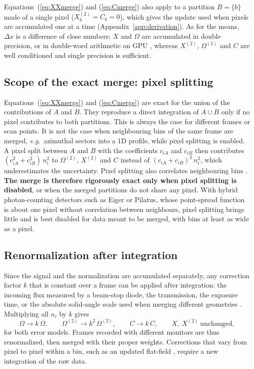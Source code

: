 \documentclass{iucrjournals}
\newcommand{\Om}{\Omega}
\newcommand{\OmS}{\Omega^{(2)}}
\newcommand{\XX}{X^{(2)}}
\begin{document}
Equations~(\ref{eq:XXmerge}) and (\ref{eq:Cmerge}) also apply to a partition $B=\{b\}$ made of a single pixel ($\XX_b=C_b=0$), which gives the update used when pixels are accumulated one at a time (Appendix~\ref{app:derivation}).
As for the means, $\Delta x$ is a difference of close numbers: $X$ and $\Om$ are accumulated in double precision, or in double-word arithmetic on GPU \cite{Joldes2017}, whereas $\XX$, $\OmS$ and $C$ are well conditioned and single precision is sufficient.

\subsection{Scope of the exact merge: pixel splitting}
\label{sec:splitting}

Equations~(\ref{eq:XXmerge}) and (\ref{eq:Cmerge}) are exact for the union of the contributions of $A$ and $B$.
They reproduce a direct integration of $A\cup B$ only if no pixel contributes to both partitions.
This is always the case for different frames or scan points.
It is not the case when neighbouring bins of the same frame are merged, \emph{e.g.}\ azimuthal sectors into a 1D profile, while pixel splitting is enabled.
A pixel split between $A$ and $B$ with the coefficients $c_{iA}$ and $c_{iB}$ then contributes $(c_{iA}^2+c_{iB}^2)\,n_i^2$ to $\OmS$, $\XX$ and $C$ instead of $(c_{iA}+c_{iB})^2\,n_i^2$, which underestimates the uncertainty.
Pixel splitting also correlates neighbouring bins \cite{Yang2014}.
\textbf{The merge is therefore rigorously exact only when pixel splitting is disabled}, or when the merged partitions do not share any pixel.
With hybrid photon-counting detectors such as Eiger or Pilatus, whose point-spread function is about one pixel without correlation between neighbours, pixel splitting brings little and is best disabled for data meant to be merged, with bins at least as wide as a pixel.

\subsection{Renormalization after integration}
\label{sec:renorm}

Since the signal and the normalization are accumulated separately, any correction factor $k$ that is constant over a frame can be applied after integration: the incoming flux measured by a beam-stop diode, the transmission, the exposure time, or the absolute solid-angle scale used when merging different geometries \cite{Kieffer2020}.
Multiplying all $n_i$ by $k$ gives
\begin{equation}
  \Om\to k\,\Om, \qquad \OmS\to k^2\,\OmS, \qquad C\to k\,C, \qquad X,\ \XX\ \text{unchanged},
  \label{eq:renorm}
\end{equation}
for both error models.
Frames recorded with different monitors are thus renormalized, then merged with their proper weights.
Corrections that vary from pixel to pixel within a bin, such as an updated flat-field \cite{Weng2023}, require a new integration of the raw data.
\end{document}
